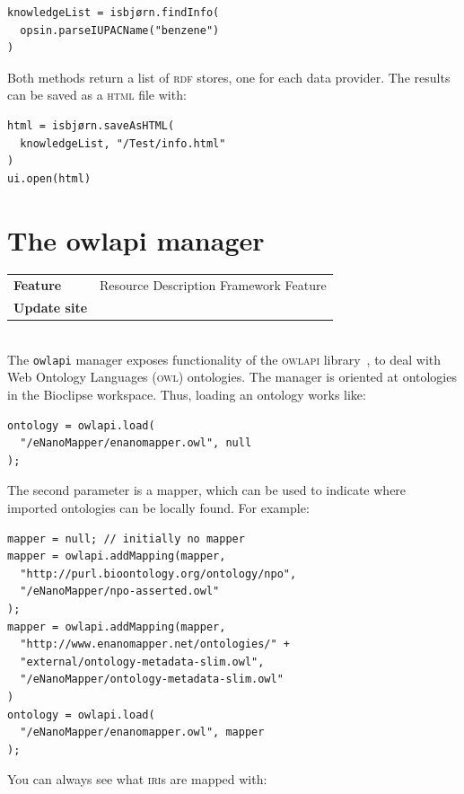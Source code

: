 \documentclass[a5paper, 10pt]{memoir}
\begin{document}
\begin{refsection}
\begin{Verbatim}
knowledgeList = isbjørn.findInfo(
  opsin.parseIUPACName("benzene")
)
\end{Verbatim}
Both methods return a list of \textsc{rdf} stores, one for each data provider.
The results can be saved as a \textsc{html} file with:

\begin{Verbatim}
html = isbjørn.saveAsHTML(
  knowledgeList, "/Test/info.html"
)
ui.open(html)
\end{Verbatim}

\section{The owlapi manager}

\begin{tabular}{ll}
\textbf{Feature} & Resource Description Framework Feature \\
\textbf{Update site} & \url{} \\
\end{tabular} \\

\noindent
The \texttt{owlapi} manager exposes functionality of the
\textsc{owlapi} library~\cite{Horridge2011}, to deal with Web
Ontology Languages (\textsc{owl})
ontologies. The manager is oriented at ontologies in the Bioclipse workspace.
Thus, loading an ontology works like:

\begin{Verbatim}
ontology = owlapi.load(
  "/eNanoMapper/enanomapper.owl", null
);
\end{Verbatim}
The second parameter is a mapper, which can be used to indicate where imported
ontologies can be locally found. For example:

\begin{Verbatim}
mapper = null; // initially no mapper
mapper = owlapi.addMapping(mapper,
  "http://purl.bioontology.org/ontology/npo",
  "/eNanoMapper/npo-asserted.owl"
);
mapper = owlapi.addMapping(mapper,
  "http://www.enanomapper.net/ontologies/" + 
  "external/ontology-metadata-slim.owl",
  "/eNanoMapper/ontology-metadata-slim.owl"
)
ontology = owlapi.load(
  "/eNanoMapper/enanomapper.owl", mapper
);
\end{Verbatim}
You can always see what \textsc{iri}s are mapped with:


\end{refsection}
\end{document}
